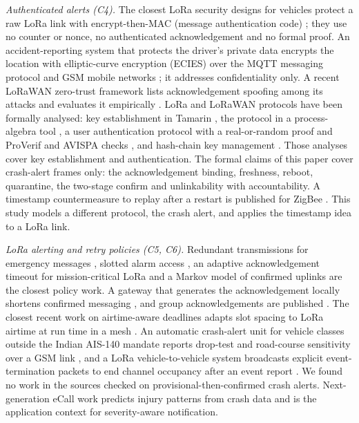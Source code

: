 \documentclass{ieeeaccess}
\begin{document}
\emph{Authenticated alerts (C4).} The closest LoRa security designs for vehicles protect a raw LoRa link with encrypt-then-MAC (message authentication code) \cite{Manuel2021_sn,Manuel2022_access}; they use no counter or nonce, no authenticated acknowledgement and no formal proof. An accident-reporting system that protects the driver's private data encrypts the location with elliptic-curve encryption (ECIES) over the MQTT messaging protocol and GSM mobile networks \cite{Alkhaiwani2023_su}; it addresses confidentiality only. A recent LoRaWAN zero-trust framework lists acknowledgement spoofing among its attacks and evaluates it empirically \cite{Abdelhady2026_access}. LoRa and LoRaWAN protocols have been formally analysed: key establishment in Tamarin \cite{wesemeyer2020}, the protocol in a process-algebra tool \cite{dong2024}, a user authentication protocol with a real-or-random proof and ProVerif and AVISPA checks \cite{Jabbari2022_tii}, and hash-chain key management \cite{Hakeem2021_s2117583}. Those analyses cover key establishment and authentication. The formal claims of this paper cover crash-alert frames only: the acknowledgement binding, freshness, reboot, quarantine, the two-stage confirm and unlinkability with accountability. A timestamp countermeasure to replay after a restart is published for ZigBee \cite{Farha2020_tmc20203}. This study models a different protocol, the crash alert, and applies the timestamp idea to a LoRa link.

\emph{LoRa alerting and retry policies (C5, C6).} Redundant transmissions for emergency messages \cite{Sisinni2022_tii20213}, slotted alarm access \cite{tamang2023}, an adaptive acknowledgement timeout for mission-critical LoRa \cite{nessa2020} and a Markov model of confirmed uplinks \cite{khan2019} are the closest policy work. A gateway that generates the acknowledgement locally shortens confirmed messaging \cite{Zhong2024_s4159802}, and group acknowledgements are published \cite{Lee2021_s2104144}. The closest recent work on airtime-aware deadlines adapts slot spacing to LoRa airtime at run time in a mesh \cite{Kagai2026_telecom}. An automatic crash-alert unit for vehicle classes outside the Indian AIS-140 mandate reports drop-test and road-course sensitivity over a GSM link \cite{Thangamani2026_icces}, and a LoRa vehicle-to-vehicle system broadcasts explicit event-termination packets to end channel occupancy after an event report \cite{AlShammaa2025_jcomss}. We found no work in the sources checked on provisional-then-confirmed crash alerts. Next-generation eCall work predicts injury patterns from crash data \cite{Hetz2026_trip} and is the application context for severity-aware notification.
\end{document}
